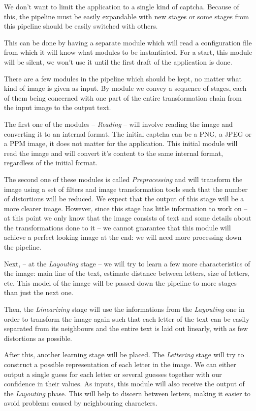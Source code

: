 \documentclass[a4paper,12pt]{article}
\begin{document}
We don't want to limit the application to a single kind of captcha. Because of
this, the pipeline must be easily expandable with new stages or some stages
from this pipeline should be easily switched with others.

This can be done by having a separate module which will read a configuration
file from which it will know what modules to be instantiated. For a start,
this module will be silent, we won't use it until the first draft of the
application is done.

There are a few modules in the pipeline which should be kept, no matter what
kind of image is given as input. By module we convey a sequence of stages,
each of them being concerned with one part of the entire transformation chain
from the input image to the output text.

The first one of the modules -- \textit{Reading} -- will involve reading the
image and converting it to an internal format. The initial captcha can be a
PNG, a JPEG or a PPM image, it does not matter for the application. This
initial module will read the image and will convert it's content to the same
internal format, regardless of the initial format.

The second one of these modules is called \textit{Preprocessing} and will
transform the image using a set of filters and image transformation tools such
that the number of distortions will be reduced. We expect that the output of
this stage will be a more clearer image. However, since this stage has little
information to work on -- at this point we only know that the image consists
of text and some details about the transformations done to it -- we cannot
guarantee that this module will achieve a perfect looking image at the end: we
will need more processing down the pipeline.

Next, -- at the \textit{Layouting} stage -- we will try to learn a few more
characteristics of the image: main line of the text, estimate distance between
letters, size of letters, etc. This model of the image will be passed down the
pipeline to more stages than just the next one.

Then, the \textit{Linearizing} stage will use the informations from the
\textit{Layouting} one in order to transform the image again such that each
letter of the text can be easily separated from its neighbours and the entire
text is laid out linearly, with as few distortions as possible.

After this, another learning stage will be placed. The \textit{Lettering}
stage will try to construct a possible representation of each letter in the
image. We can either output a single guess for each letter or several guesses
together with our confidence in their values. As inputs, this module will also
receive the output of the \textit{Layouting} phase. This will help to discern
between letters, making it easier to avoid problems caused by neighbouring
characters.
\end{document}
